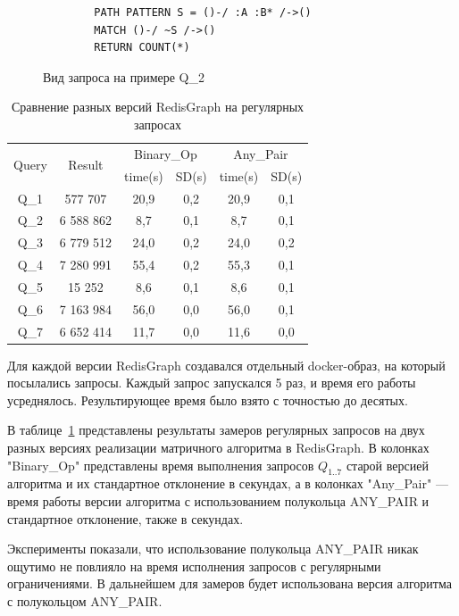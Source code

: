 \documentclass[14pt]{matmex-diploma-custom}
\begin{document}
\begin{figure}[h!]
    \begin{verbatim}
        PATH PATTERN S = ()-/ :A :B* /->()
        MATCH ()-/ ~S /->()
        RETURN COUNT(*)
    \end{verbatim}
    \caption{Вид запроса на примере Q_2}
    \label{rpq}
\end{figure}

\begin{table}[h!]
    \centering
    \begin{tabular}{ |c||c|c|c|c|c| }
        \hline
         \multirow{2}{*}{Query} & \multirow{2}{*}{Result} & \multicolumn{2}{|c|}{Binary\_Op} & \multicolumn{2}{|c|}{Any\_Pair}\\
         \cline{3---6} & & time(s) & SD(s) & time(s) & SD(s) \\
         \hline
         Q_1 & 577 707 & 20,9 & 0,2 & 20,9 & 0,1\\
         Q_2 & 6 588 862 & 8,7 & 0,1 & 8,7 & 0,1\\
         Q_3 & 6 779 512 & 24,0 & 0,2 & 24,0 & 0,2\\
         Q_4 & 7 280 991 & 55,4 & 0,2 & 55,3 & 0,1\\
         Q_5 & 15 252 & 8,6 & 0,1 & 8,6 & 0,1\\
         Q_6 & 7 163 984 & 56,0 & 0,0 & 56,0 & 0,1 \\
         Q_7 & 6 652 414 & 11,7 & 0,0 & 11,6 & 0,0 \\
         \hline
    \end{tabular}
    \caption{Сравнение разных версий RedisGraph на регулярных запросах}
    \label{tab:redisgraph_rpq}
\end{table}

 Для каждой версии RedisGraph создавался отдельный docker-образ, на который посылались запросы. Каждый запрос запускался 5 раз, и время его работы усреднялось. Результирующее время было взято с точностью до десятых.
 
В таблице~\ref{tab:redisgraph_rpq} представлены результаты замеров регулярных запросов на двух разных версиях реализации матричного алгоритма в RedisGraph. В колонках "Binary\_Op" представлены время выполнения запросов $Q_{1..7}$ старой версией алгоритма и их стандартное отклонение в секундах, а в колонках "Any\_Pair" --- время работы версии алгоритма с использованием полукольца ANY\_PAIR и стандартное отклонение, также в секундах.

Эксперименты показали, что использование полукольца ANY\_PAIR никак ощутимо не повлияло на время исполнения запросов с регулярными ограничениями. В дальнейшем для замеров будет использована версия алгоритма с полукольцом ANY\_PAIR.
\end{document}
